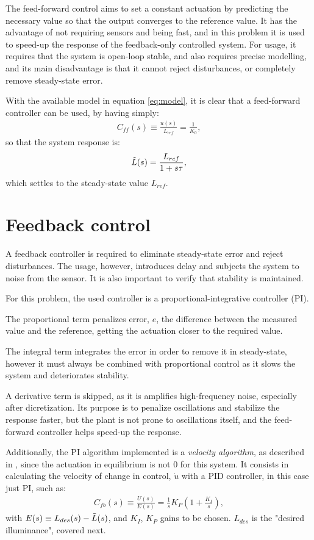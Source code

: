 \documentclass[english,fira]{ist-report}
\begin{document}
The feed-forward control aims to set a constant actuation by predicting the necessary value so that the output converges to the reference value. 
It has the advantage of not requiring sensors and being fast, and in this problem it is used to speed-up the response of the feedback-only controlled system. 
For usage, it requires that the system is open-loop stable, and also requires precise modelling, and its 
main disadvantage is that it cannot reject disturbances, or completely remove steady-state error.

With the available model in equation \ref{eq:model}, it is clear that a feed-forward controller can be used, by having simply:
\begin{align}
    C_{ff}(s) \equiv \frac{u(s)}{L_{ref}} = \frac{1}{K_0},
    \label{eq:ff}
\end{align}
so that the system response is:
\begin{align}
    \Tilde{L}(s) = \frac{L_{ref}}{1+s\tau}, 
    \label{eq:response-ff}
\end{align}
which settles to the steady-state value $L_{ref}$.

\section{Feedback control} 
\label{feedback control}

A feedback controller is required to eliminate steady-state error and reject disturbances. 
The usage, however, introduces delay and subjects the system to noise from the sensor. 
It is also important to verify that stability is maintained.

For this problem, the used controller is a proportional-integrative controller (PI). 

The proportional term penalizes error, $e$, the difference between the measured value and the reference, getting the actuation closer to the required value.

The integral term integrates the error in order to remove it in steady-state, however it must always be combined with proportional control as it slows the system and deteriorates stability.

A derivative term is skipped, as it is amplifies high-frequency noise, especially after dicretization.
Its purpose is to penalize oscillations and stabilize the response faster, but the plant is not prone to oscillations itself, and the feed-forward controller helps speed-up the response.

Additionally, the PI algorithm implemented is a \emph{velocity algorithm}, as described in \cite{bennett1994real}, since the actuation in equilibrium is not $0$ for this system. It consists in calculating the velocity of change in control, $\Dot{u}$ with a PID controller, in this case just PI, such as:
\begin{align}
    C_{fb}(s) \equiv \frac{U(s)}{E(s)} = \frac{1}{s}K_P\left( 1 + \frac{K_I}{s} \right),
    \label{eq:fb}
\end{align}
with $E(s) \equiv L_{des}(s)-\Tilde{L}(s)$, and $K_I$, $K_P$ gains to be chosen. $L_{des}$ is the "desired illuminance", covered next.
\end{document}

